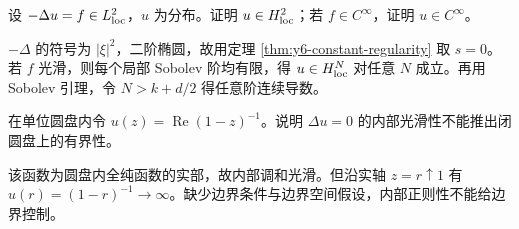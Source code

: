 \begin{exercise}\label{ex:y6-poisson-regularity}
设 $-\Delta u=f\in L^2_{\mathrm{loc}}$，$u$ 为分布。证明 $u\in H^2_{\mathrm{loc}}$；若 $f\in C^\infty$，证明 $u\in C^\infty$。
\end{exercise}
\begin{solution}
$-\Delta$ 的符号为 $|\xi|^2$，二阶椭圆，故用定理 \ref{thm:y6-constant-regularity} 取 $s=0$。若 $f$ 光滑，则每个局部 Sobolev 阶均有限，得 $u\in H^N_{\mathrm{loc}}$ 对任意 $N$ 成立。再用 Sobolev 引理，令 $N>k+d/2$ 得任意阶连续导数。
\end{solution}

\begin{exercise}[内部不包含边界]\label{ex:y6-boundary}
在单位圆盘内令 $u(z)=\operatorname{Re}(1-z)^{-1}$。说明 $\Delta u=0$ 的内部光滑性不能推出闭圆盘上的有界性。
\end{exercise}
\begin{solution}
该函数为圆盘内全纯函数的实部，故内部调和光滑。但沿实轴 $z=r\uparrow1$ 有 $u(r)=(1-r)^{-1}\to\infty$。缺少边界条件与边界空间假设，内部正则性不能给边界控制。
\end{solution}
